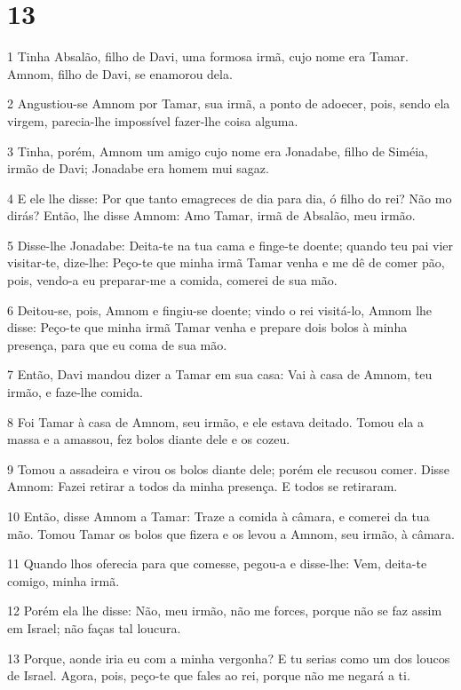 \chapter{13}

\par 1 Tinha Absalão, filho de Davi, uma formosa irmã, cujo nome era Tamar. Amnom, filho de Davi, se enamorou dela.
\par 2 Angustiou-se Amnom por Tamar, sua irmã, a ponto de adoecer, pois, sendo ela virgem, parecia-lhe impossível fazer-lhe coisa alguma.
\par 3 Tinha, porém, Amnom um amigo cujo nome era Jonadabe, filho de Siméia, irmão de Davi; Jonadabe era homem mui sagaz.
\par 4 E ele lhe disse: Por que tanto emagreces de dia para dia, ó filho do rei? Não mo dirás? Então, lhe disse Amnom: Amo Tamar, irmã de Absalão, meu irmão.
\par 5 Disse-lhe Jonadabe: Deita-te na tua cama e finge-te doente; quando teu pai vier visitar-te, dize-lhe: Peço-te que minha irmã Tamar venha e me dê de comer pão, pois, vendo-a eu preparar-me a comida, comerei de sua mão.
\par 6 Deitou-se, pois, Amnom e fingiu-se doente; vindo o rei visitá-lo, Amnom lhe disse: Peço-te que minha irmã Tamar venha e prepare dois bolos à minha presença, para que eu coma de sua mão.
\par 7 Então, Davi mandou dizer a Tamar em sua casa: Vai à casa de Amnom, teu irmão, e faze-lhe comida.
\par 8 Foi Tamar à casa de Amnom, seu irmão, e ele estava deitado. Tomou ela a massa e a amassou, fez bolos diante dele e os cozeu.
\par 9 Tomou a assadeira e virou os bolos diante dele; porém ele recusou comer. Disse Amnom: Fazei retirar a todos da minha presença. E todos se retiraram.
\par 10 Então, disse Amnom a Tamar: Traze a comida à câmara, e comerei da tua mão. Tomou Tamar os bolos que fizera e os levou a Amnom, seu irmão, à câmara.
\par 11 Quando lhos oferecia para que comesse, pegou-a e disse-lhe: Vem, deita-te comigo, minha irmã.
\par 12 Porém ela lhe disse: Não, meu irmão, não me forces, porque não se faz assim em Israel; não faças tal loucura.
\par 13 Porque, aonde iria eu com a minha vergonha? E tu serias como um dos loucos de Israel. Agora, pois, peço-te que fales ao rei, porque não me negará a ti.
